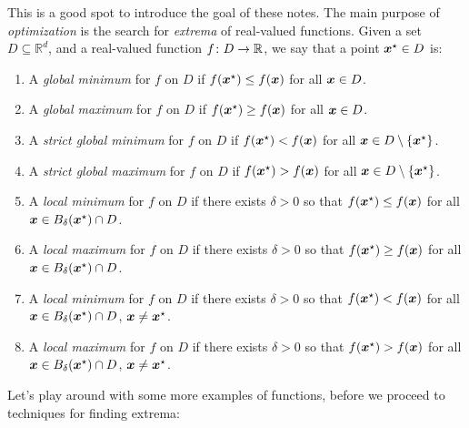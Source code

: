 This is a good spot to introduce the goal of these notes.  The main purpose of \emph{optimization} is the search for \emph{extrema} of real-valued functions.  Given a set $D \subseteq \mathbb{R}^d$, and a real-valued function $f\colon D \to \mathbb{R}$, we say that a point $\boldsymbol{x}^{\star} \in D$ is:
\begin{enumerate}
	\item A \emph{global minimum} for $f$ on $D$ if $f(\boldsymbol{x}^{\star}) \leq f(\boldsymbol{x})$ for all $\boldsymbol{x} \in D$.
	\item A \emph{global maximum} for $f$ on $D$ if $f(\boldsymbol{x}^{\star}) \geq f(\boldsymbol{x})$ for all $\boldsymbol{x} \in D$.
	\item A \emph{strict global minimum} for $f$ on $D$ if $f(\boldsymbol{x}^{\star}) < f(\boldsymbol{x})$ for all $\boldsymbol{x} \in D \setminus \{ \boldsymbol{x}^{\star} \}$.
	\item A \emph{strict global maximum} for $f$ on $D$ if $f(\boldsymbol{x}^{\star}) > f(\boldsymbol{x})$ for all $\boldsymbol{x} \in D \setminus \{ \boldsymbol{x}^{\star} \}$.
	\item A \emph{local minimum} for $f$ on $D$ if there exists $\delta>0$ so that  $f(\boldsymbol{x}^{\star}) \leq f(\boldsymbol{x})$ for all $\boldsymbol{x} \in B_\delta(\boldsymbol{x}^{\star})\cap D$.
	\item A \emph{local maximum} for $f$ on $D$ if there exists $\delta>0$ so that  $f(\boldsymbol{x}^{\star}) \geq f(\boldsymbol{x})$ for all $\boldsymbol{x} \in B_\delta(\boldsymbol{x}^{\star})\cap D$.
	\item A \emph{local minimum} for $f$ on $D$ if there exists $\delta>0$ so that  $f(\boldsymbol{x}^{\star}) < f(\boldsymbol{x})$ for all $\boldsymbol{x} \in B_\delta(\boldsymbol{x}^{\star})\cap D$, $\boldsymbol{x} \neq \boldsymbol{x}^{\star}$.
	\item A \emph{local maximum} for $f$ on $D$ if there exists $\delta>0$ so that  $f(\boldsymbol{x}^{\star}) > f(\boldsymbol{x})$ for all $\boldsymbol{x} \in B_\delta(\boldsymbol{x}^{\star})\cap D$, $\boldsymbol{x} \neq \boldsymbol{x}^{\star}$.
\end{enumerate}

Let's play around with some more examples of functions, before we proceed to techniques for finding extrema:

